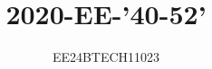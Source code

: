 \documentclass[journal,12pt,onecolumn]{IEEEtran}
\theoremstyle{remark}
\begin{document}

\vspace{3cm}


\title{2020-EE-'40-52'}
\author{EE24BTECH11023}

{\let\newpage\relax\maketitle}

\renewcommand{\thefigure}{\theenumi}
\renewcommand{\thetable}{\theenumi}
\setlength{\intextsep}{10pt} %


\renewcommand{\thetable}{\theenumi}
\end{document}
